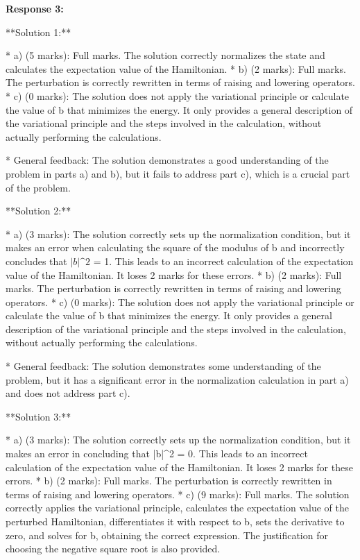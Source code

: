 \documentclass[a4paper,11pt]{article}
\begin{document}
\textbf{Response 3:}

**Solution 1:**

* a) (5 marks): Full marks. The solution correctly normalizes the state and calculates the expectation value of the Hamiltonian.
* b) (2 marks): Full marks. The perturbation is correctly rewritten in terms of raising and lowering operators.
* c) (0 marks): The solution does not apply the variational principle or calculate the value of b that minimizes the energy. It only provides a general description of the variational principle and the steps involved in the calculation, without actually performing the calculations.

* General feedback: The solution demonstrates a good understanding of the problem in parts a) and b), but it fails to address part c), which is a crucial part of the problem.

**Solution 2:**

* a) (3 marks): The solution correctly sets up the normalization condition, but it makes an error when calculating the square of the modulus of b and incorrectly concludes that \(|b|\^2\) = 1. This leads to an incorrect calculation of the expectation value of the Hamiltonian. It loses 2 marks for these errors.
* b) (2 marks): Full marks. The perturbation is correctly rewritten in terms of raising and lowering operators.
* c) (0 marks): The solution does not apply the variational principle or calculate the value of b that minimizes the energy. It only provides a general description of the variational principle and the steps involved in the calculation, without actually performing the calculations.

* General feedback: The solution demonstrates some understanding of the problem, but it has a significant error in the normalization calculation in part a) and does not address part c).

**Solution 3:**

* a) (3 marks): The solution correctly sets up the normalization condition, but it makes an error in concluding that |b|^2 = 0. This leads to an incorrect calculation of the expectation value of the Hamiltonian. It loses 2 marks for these errors.
* b) (2 marks): Full marks. The perturbation is correctly rewritten in terms of raising and lowering operators.
* c) (9 marks): Full marks. The solution correctly applies the variational principle, calculates the expectation value of the perturbed Hamiltonian, differentiates it with respect to b, sets the derivative to zero, and solves for b, obtaining the correct expression. The justification for choosing the negative square root is also provided.
\end{document}
